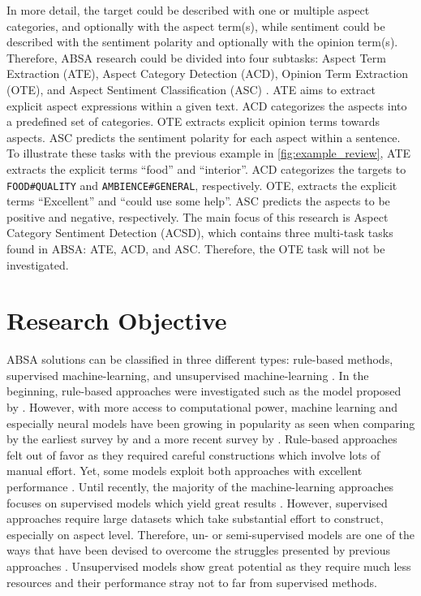 \documentclass[american, oneside]{ecsgdp}
\begin{document}
In more detail, the target could be described with one or multiple aspect categories, and optionally with the aspect term(s), while sentiment could be described with the sentiment polarity and optionally with the opinion term(s). Therefore, ABSA research could be divided into four subtasks: Aspect Term Extraction (ATE), Aspect Category Detection (ACD), Opinion Term Extraction (OTE), and Aspect Sentiment Classification (ASC) \parencite{Zhang2022Survey}. ATE aims to extract explicit aspect expressions within a given text. ACD categorizes the aspects into a predefined set of categories. OTE extracts explicit opinion terms towards aspects. ASC predicts the sentiment polarity for each aspect within a sentence. To illustrate these tasks with the previous example in \cref{fig:example_review}, ATE extracts the explicit terms ``food'' and ``interior''. ACD categorizes the targets to \texttt{FOOD\#QUALITY} and \texttt{AMBIENCE\#GENERAL}, respectively. OTE, extracts the explicit terms ``Excellent'' and ``could use some help''. ASC predicts the aspects to be positive and negative, respectively. The main focus of this research is Aspect Category Sentiment Detection (ACSD), which contains three multi-task tasks found in ABSA: ATE, ACD, and ASC. Therefore, the OTE task will not be investigated.

\section{Research Objective} \label{sec:objective}
ABSA solutions can be classified in three different types: rule-based methods, supervised machine-learning, and unsupervised machine-learning \parencite{Schouten2016Survey}. In the beginning, rule-based approaches were investigated such as the model proposed by \textcite{Hu2004Rules}. However, with more access to computational power, machine learning and especially neural models have been growing in popularity as seen when comparing by the earliest survey by \textcite{Schouten2016Survey} and a more recent survey by \textcite{Zhang2022Survey}. Rule-based approaches felt out of favor as they required careful constructions which involve lots of manual effort. Yet, some models exploit both approaches with excellent performance \parencite{Trusca2020HAABSA++, Meskele2020ALDONAr}. Until recently, the majority of the machine-learning approaches focuses on supervised models which yield great results \parencite{Zhang2022Survey}. However, supervised approaches require large datasets which take substantial effort to construct, especially on aspect level. Therefore, un- or semi-supervised models are one of the ways that have been devised to overcome the struggles presented by previous approaches \parencite{He2017ABAE}. Unsupervised models show great potential as they require much less resources and their performance stray not to far from supervised methods.
\end{document}
